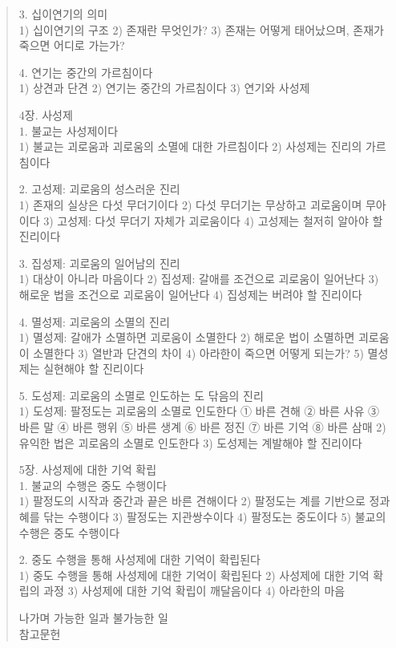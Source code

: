 \documentclass[12pt, a4paper, oneside]{book}
\begin{document}
\begin{quotation}
3. 십이연기의 의미\\
1) 십이연기의 구조
2) 존재란 무엇인가?
3) 존재는 어떻게 태어났으며, 존재가 죽으면 어디로 가는가?

4. 연기는 중간의 가르침이다\\
1) 상견과 단견
2) 연기는 중간의 가르침이다
3) 연기와 사성제

4장. 사성제\\

1. 불교는 사성제이다\\
1) 불교는 괴로움과 괴로움의 소멸에 대한 가르침이다
2) 사성제는 진리의 가르침이다

2. 고성제: 괴로움의 성스러운 진리\\
1) 존재의 실상은 다섯 무더기이다
2) 다섯 무더기는 무상하고 괴로움이며 무아이다
3) 고성제: 다섯 무더기 자체가 괴로움이다
4) 고성제는 철저히 알아야 할 진리이다

3. 집성제: 괴로움의 일어남의 진리\\
1) 대상이 아니라 마음이다
2) 집성제: 갈애를 조건으로 괴로움이 일어난다
3) 해로운 법을 조건으로 괴로움이 일어난다
4) 집성제는 버려야 할 진리이다

4. 멸성제: 괴로움의 소멸의 진리\\
1) 멸성제: 갈애가 소멸하면 괴로움이 소멸한다
2) 해로운 법이 소멸하면 괴로움이 소멸한다
3) 열반과 단견의 차이
4) 아라한이 죽으면 어떻게 되는가?
5) 멸성제는 실현해야 할 진리이다

5. 도성제: 괴로움의 소멸로 인도하는 도 닦음의 진리\\
1) 도성제: 팔정도는 괴로움의 소멸로 인도한다
① 바른 견해
② 바른 사유
③ 바른 말
④ 바른 행위
⑤ 바른 생계
⑥ 바른 정진
⑦ 바른 기억
⑧ 바른 삼매
2) 유익한 법은 괴로움의 소멸로 인도한다
3) 도성제는 계발해야 할 진리이다

5장. 사성제에 대한 기억 확립\\

1. 불교의 수행은 중도 수행이다\\
1) 팔정도의 시작과 중간과 끝은 바른 견해이다
2) 팔정도는 계를 기반으로 정과 혜를 닦는 수행이다
3) 팔정도는 지관쌍수이다
4) 팔정도는 중도이다
5) 불교의 수행은 중도 수행이다

2. 중도 수행을 통해 사성제에 대한 기억이 확립된다\\
1) 중도 수행을 통해 사성제에 대한 기억이 확립된다
2) 사성제에 대한 기억 확립의 과정
3) 사성제에 대한 기억 확립이 깨달음이다
4) 아라한의 마음

나가며  가능한 일과 불가능한 일\\
참고문헌\\

\end{quotation}
\end{document}
